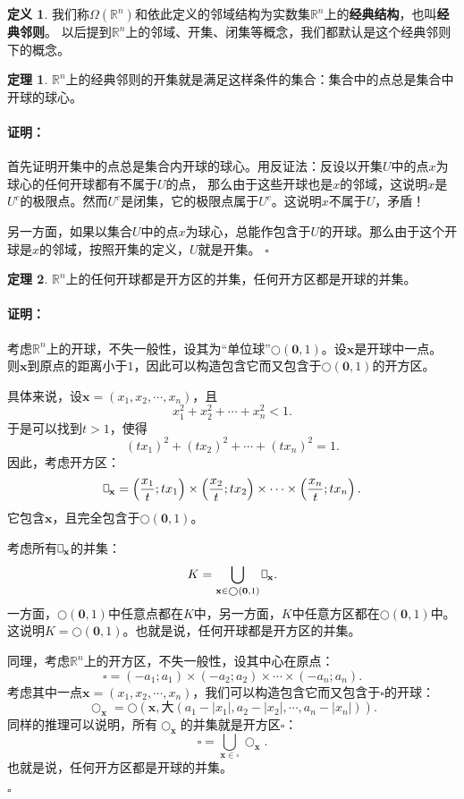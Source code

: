 \documentclass[12pt,UTF8]{ctexbook}
\newcommand{\rectbx}{%
    \mathord{\text{%
        \tikz[baseline] \draw (0,.1ex) -- (.4em,.1ex) -- (.4em,1.5ex) -- (0em,1.5ex) -- cycle;}
    }
}
\theoremstyle{definition}
\newtheorem{df}{定义}[section]
\newtheorem{tm}{定理}[section]
\theoremstyle{plain}
\renewenvironment{proof}{\paragraph{\textbf{证明：}}}{\hfill$\square$}
\begin{document}
\begin{appendix}
\begin{df}
    我们称$\Omega(\mathbb{R}^n)$和依此定义的邻域结构为实数集$\mathbb{R}^n$上的\textbf{经典结构}，也叫\textbf{经典邻则}。
    以后提到$\mathbb{R}^n$上的邻域、开集、闭集等概念，我们都默认是这个经典邻则下的概念。
\end{df}

\begin{tm}\label{tm:b-0-10}
    $\mathbb{R}^n$上的经典邻则的开集就是满足这样条件的集合：集合中的点总是集合中开球的球心。
\end{tm}

\begin{proof}
    首先证明开集中的点总是集合内开球的球心。用反证法：反设以开集$U$中的点$x$为球心的任何开球都有不属于$U$的点，
    那么由于这些开球也是$x$的邻域，这说明$x$是$U^c$的极限点。然而$U^c$是闭集，它的极限点属于$U^c$。这说明$x$不属于$U$，矛盾！

    另一方面，如果以集合$U$中的点$x$为球心，总能作包含于$U$的开球。那么由于这个开球是$x$的邻域，按照开集的定义，$U$就是开集。
\end{proof}

\begin{tm}\label{tm:b-1-30}
    $\mathbb{R}^n$上的任何开球都是开方区的并集，任何开方区都是开球的并集。
\end{tm}

\begin{proof}
    考虑$\mathbb{R}^n$上的开球，不失一般性，设其为“单位球”$\bigcirc(\mathbf{0}, 1)$。设$\mathbf{x}$是开球中一点。
    则$\mathbf{x}$到原点的距离小于$1$，因此可以构造包含它而又包含于$\bigcirc(\mathbf{0}, 1)$的开方区。

    具体来说，设$\mathbf{x} = (x_1, x_2, \cdots, x_n)$，且
    $$ x_1^2 + x_2^2 + \cdots + x_n^2 < 1.$$
    于是可以找到$t>1$，使得
    $$ (tx_1)^2 + (tx_2)^2 + \cdots + (tx_n)^2 = 1.$$
    因此，考虑开方区：
    $$ \rectbx_{\mathbf{x}} = \left(\frac{x_1}{t};tx_1\right)\times\left(\frac{x_2}{t};tx_2\right)\times\cdots\times\left(\frac{x_n}{t};tx_n\right).$$
    它包含$\mathbf{x}$，且完全包含于$\bigcirc(\mathbf{0}, 1)$。

    考虑所有$\rectbx_{\mathbf{x}}$的并集：
    $$ K = \bigcup_{\mathbf{x}\in \bigcirc(\mathbf{0}, 1)} \rectbx_{\mathbf{x}}. $$
    一方面，$\bigcirc(\mathbf{0}, 1)$中任意点都在$K$中，另一方面，$K$中任意方区都在$\bigcirc(\mathbf{0}, 1)$中。
    这说明$K = \bigcirc(\mathbf{0}, 1)$。也就是说，任何开球都是开方区的并集。

    同理，考虑$\mathbb{R}^n$上的开方区，不失一般性，设其中心在原点：
    $$ \square = (-a_1;a_1)\times(-a_2;a_2)\times\cdots\times(-a_n;a_n). $$
    考虑其中一点$\mathbf{x} = (x_1, x_2, \cdots, x_n)$，我们可以构造包含它而又包含于$\square$的开球：
    $$ \bigcirc_{\mathbf{x}} = \bigcirc(\mathbf{x}, \text{大}(a_1 - |x_1|, a_2 - |x_2|, \cdots, a_n - |x_n|)). $$
    同样的推理可以说明，所有$\bigcirc_{\mathbf{x}}$的并集就是开方区$\square$：
    $$ \square = \bigcup_{\mathbf{x}\in \square} \bigcirc_{\mathbf{x}}. $$
    也就是说，任何开方区都是开球的并集。


\end{proof}
\end{appendix}
\end{document}

